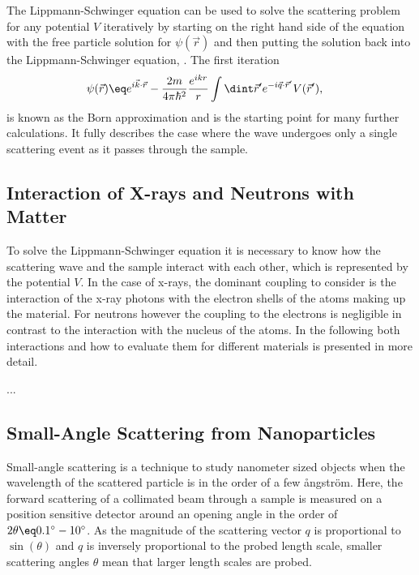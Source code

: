 \documentclass[\main/dresen_thesis.tex]{subfiles}
\begin{document}
The Lippmann-Schwinger equation can be used to solve the scattering problem for any potential $V$ iteratively by starting on the right hand side of the equation with the free particle solution for $\psi (\vec{r})$ and then putting the solution back into the Lippmann-Schwinger equation, \etc.
The first iteration 
\begin{align}
  \psi (\vec{r}) &\eq e^{i\vec{k} \cdot \vec{r}} - \frac{2m}{4 \pi\hbar^2} \frac{e^{ikr}}{r} \int \dint \vec{r}^\prime e^{-i\vec{q} \cdot \vec{r}^\prime} V (\vec{r}^\prime),\label{eq:theoreticalBackground:scattering:scatteringTheory:firstBornApproximation}
\end{align}
is known as the Born approximation and is the starting point for many further calculations. It fully describes the case where the wave undergoes only a single scattering event as it passes through the sample. 

\subsection{Interaction of X-rays and Neutrons with Matter}\label{sec:theoreticalBackground:scattering:interactionWithMatter}
To solve the Lippmann-Schwinger equation it is necessary to know how the scattering wave and the sample interact with each other, which is represented by the potential $V$. In the case of x-rays, the dominant coupling to consider is the interaction of the x-ray photons with the electron shells of the atoms making up the material. For neutrons however the coupling to the electrons is negligible in contrast to the interaction with the nucleus of the atoms. In the following both interactions and how to evaluate them for different materials is presented in more detail.

...
\subsection{Small-Angle Scattering from Nanoparticles}\label{sec:theoreticalBackground:scattering:SASNanoparticles}
Small-angle scattering is a technique to study nanometer sized objects when the wavelength of the scattered particle is in the order of a few {\aa}ngstr\"om. 
Here, the forward scattering of a collimated beam through a sample is measured on a position sensitive detector around an opening angle in the order of $2 \theta \eq 0.1^\circ - 10^\circ$. 
As the magnitude of the scattering vector $q$ is proportional to $\sin(\theta)$ and $q$ is inversely proportional to the probed length scale, smaller scattering angles $\theta$ mean that larger length scales are probed. 
\end{document}

